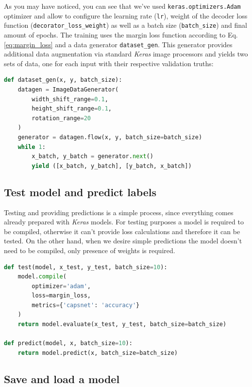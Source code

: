 As you may have noticed, you can see that we've used \texttt{keras.optimizers.Adam} optimizer and allow to configure the learning rate (\texttt{lr}), weight of the decoder loss function (\texttt{decorator\_loss\_weight}) as well as a batch size (\texttt{batch\_size}) and final amount of epochs. The training uses the margin loss function according to Eq.\,\ref{eq:margin_loss} and a data generator \texttt{dataset\_gen}. This generator provides additional data augmentation via standard \textit{Keras} image processors and yields two sets of data, one for each input with their respective validation truths:

\begin{lstlisting}[language=Python, caption=Data generator example.]
def dataset_gen(x, y, batch_size):
    datagen = ImageDataGenerator(
        width_shift_range=0.1,
        height_shift_range=0.1,
        rotation_range=20
    )
    generator = datagen.flow(x, y, batch_size=batch_size)
    while 1:
        x_batch, y_batch = generator.next()
        yield ([x_batch, y_batch], [y_batch, x_batch])
\end{lstlisting}

\subsection{Test model and predict labels}

Testing and providing predictions is a simple process, since everything comes already prepared with \textit{Keras} models. For testing purposes a model is required to be compiled, otherwise it can't provide loss calculations and therefore it can be tested. On the other hand, when we desire simple predictions the model doesn't need to be compiled, only presence of weights is required.

\begin{lstlisting}[language=Python, caption=Test run and prediction of a \textit{Keras} model example.]
def test(model, x_test, y_test, batch_size=10):
    model.compile(
        optimizer='adam',
        loss=margin_loss,
        metrics={'capsnet': 'accuracy'}
    )
    return model.evaluate(x_test, y_test, batch_size=batch_size)

def predict(model, x, batch_size=10):
    return model.predict(x, batch_size=batch_size)
\end{lstlisting}

\subsection{Save and load a model}
\label{ss:save_model}

